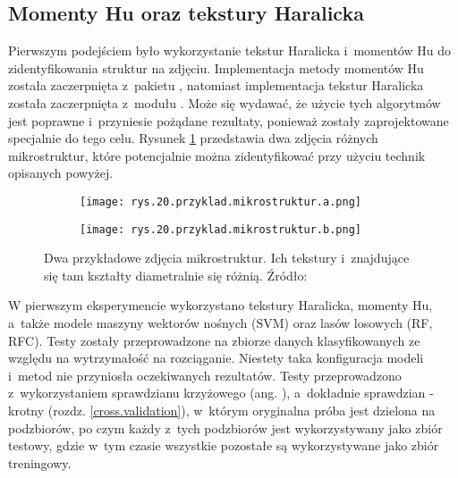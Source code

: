\subsection{Momenty Hu oraz tekstury Haralicka}
\label{sec:hu_haralick}

Pierwszym podejściem było wykorzystanie tekstur Haralicka i~momentów Hu do zidentyfikowania struktur na zdjęciu. Implementacja metody momentów Hu została zaczerpnięta z~pakietu , natomiast implementacja tekstur Haralicka została zaczerpnięta z~modułu . Może się wydawać, że użycie tych algorytmów jest poprawne i~przyniesie pożądane rezultaty, ponieważ zostały zaprojektowane specjalnie do tego celu. Rysunek \ref{fig:mesh20} przedstawia dwa zdjęcia różnych mikrostruktur, które potencjalnie można zidentyfikować przy użyciu technik opisanych powyżej.
\begin{figure}[h]
	\centering
	\begin{subfigure}{0.47\textwidth}
	    \centering
	    \texttt{[image: rys.20.przyklad.mikrostruktur.a.png]}
	\end{subfigure}
	\begin{subfigure}{0.47\textwidth}
	    \centering
	    \texttt{[image: rys.20.przyklad.mikrostruktur.b.png]}
	\end{subfigure}
	\caption{\label{fig:mesh20}Dwa przykładowe zdjęcia mikrostruktur. Ich tekstury i~znajdujące się tam kształty diametralnie się różnią. Źródło: \cite{Pirowski17}}
\end{figure}
W pierwszym eksperymencie wykorzystano tekstury Haralicka, momenty Hu, a~także modele maszyny wektorów nośnych (SVM) oraz lasów losowych (RF, RFC). Testy zostały przeprowadzone na zbiorze danych klasyfikowanych ze względu na wytrzymałość na rozciąganie. Niestety taka konfiguracja modeli i~metod nie przyniosła oczekiwanych rezultatów. Testy przeprowadzono z~wykorzystaniem sprawdzianu krzyżowego (ang. ), a~dokładnie sprawdzian -krotny (rozdz. \ref{cross.validation}), w~którym oryginalna próba jest dzielona na  podzbiorów, po czym każdy z~tych podzbiorów jest wykorzystywany jako zbiór testowy, gdzie w~tym czasie wszystkie pozostałe są wykorzystywane jako zbiór treningowy.
